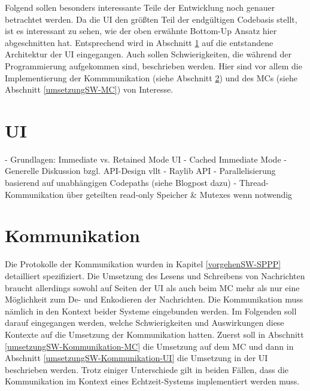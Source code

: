 
Folgend sollen besonders interessante Teile der Entwicklung noch genauer betrachtet werden.
Da die \ac{UI} den größten Teil der endgültigen Codebasis stellt, ist es interessant zu sehen, wie der oben erwähnte Bottom-Up Ansatz hier abgeschnitten hat.
Entsprechend wird in Abschnitt \ref{umsetzungSW-UI} auf die entstandene Architektur der \ac{UI} eingegangen.
Auch sollen Schwierigkeiten, die während der Programmierung aufgekommen sind, beschrieben werden.
Hier sind vor allem die Implementierung der Kommmunikation (siehe Abschnitt \ref{umsetzungSW-Kommunikation}) und des \ac{MC}s (siehe Abschnitt \ref{umsetzungSW-MC}) von Interesse.


\section{UI} \label{umsetzungSW-UI}
- Grundlagen: Immediate vs. Retained Mode UI \newline
- Cached Immediate Mode \newline
- Generelle Diskussion bzgl. API-Design vllt \newline
- Raylib API \newline
- Parallelisierung basierend auf unabhängigen Codepaths (siehe Blogpost dazu) \newline
- Thread-Kommunikation über geteilten read-only Speicher \& Mutexes wenn notwendig \newline


\section{Kommunikation} \label{umsetzungSW-Kommunikation}

Die Protokolle der Kommunikation wurden in Kapitel \ref{vorgehenSW-SPPP} detailliert spezifiziert.
Die Umsetzung des Lesens und Schreibens von Nachrichten braucht allerdings sowohl auf Seiten der \ac{UI} als auch beim \ac{MC} mehr als nur eine Möglichkeit zum De- und Enkodieren der Nachrichten.
Die Kommunikation muss nämlich in den Kontext beider Systeme eingebunden werden.
Im Folgenden soll darauf eingegangen werden, welche Schwierigkeiten und Auswirkungen diese Kontexte auf die Umsetzung der Kommunikation hatten.
Zuerst soll in Abschnitt \ref{umsetzungSW-Kommunikation-MC} die Umsetzung auf dem \ac{MC} und dann in Abschnitt \ref{umsetzungSW-Kommunikation-UI} die Umsetzung in der \ac{UI} beschrieben werden.
Trotz einiger Unterschiede gilt in beiden Fällen, dass die Kommunikation im Kontext eines Echtzeit-Systems implementiert werden muss.

